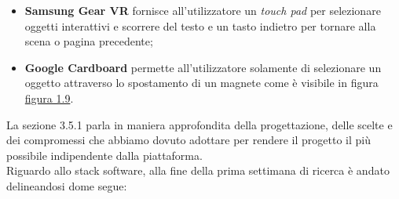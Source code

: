 \begin{itemize}
	\item \textbf{Samsung Gear VR} fornisce all'utilizzatore un \textit{touch pad} per selezionare oggetti interattivi e scorrere del testo e un tasto indietro per tornare alla scena o pagina precedente;
	\item \textbf{Google Cardboard} permette all'utilizzatore solamente di selezionare un oggetto attraverso lo spostamento di un magnete come è visibile in figura \hyperlink{gc}{figura 1.9}.
\end{itemize}

La sezione 3.5.1 parla in maniera approfondita della progettazione, delle scelte e dei compromessi che abbiamo dovuto adottare per rendere il progetto il più possibile indipendente dalla piattaforma. \\
Riguardo allo stack software, alla fine della prima settimana di ricerca è andato delineandosi dome segue:

